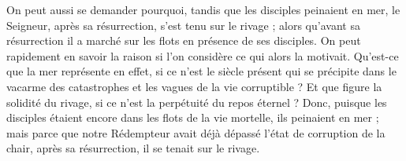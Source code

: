  On peut aussi se demander pourquoi, tandis que les disciples peinaient en mer, le Seigneur, après sa résurrection, s’est tenu sur le rivage ; alors qu’avant sa résurrection il a marché sur les flots en présence de ses disciples. On peut rapidement en savoir la raison si l’on considère ce qui alors la motivait. Qu’est-ce que la mer représente en effet, si ce n’est le siècle présent qui se précipite dans le vacarme des catastrophes et les vagues de la vie corruptible ? Et que figure la solidité du rivage, si ce n’est la perpétuité du repos éternel ? Donc, puisque les disciples étaient encore dans les flots de la vie mortelle, ils peinaient en mer ; mais parce que notre Rédempteur avait déjà dépassé l’état de corruption de la chair, après sa résurrection, il se tenait sur le rivage.